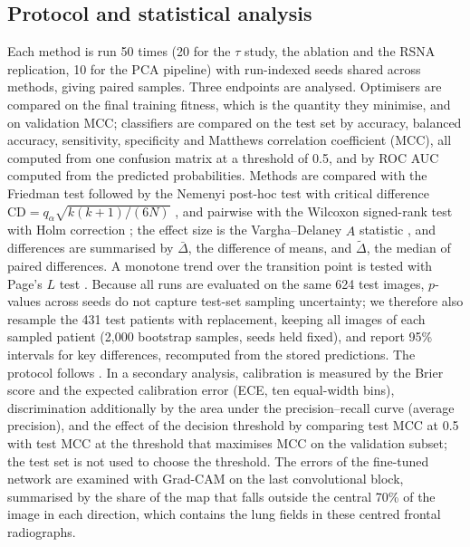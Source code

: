\documentclass[preprint,12pt]{elsarticle}
\begin{document}
\subsection{Protocol and statistical analysis}\label{sec:protocol}
Each method is run 50 times (20 for the $\tau$ study, the ablation and the RSNA replication, 10 for the PCA pipeline) with run-indexed seeds shared across methods, giving paired samples. Three endpoints are analysed. Optimisers are compared on the final training fitness, which is the quantity they minimise, and on validation MCC; classifiers are compared on the test set by accuracy, balanced accuracy, sensitivity, specificity and Matthews correlation coefficient (MCC), all computed from one confusion matrix at a threshold of 0.5, and by ROC AUC computed from the predicted probabilities. Methods are compared with the Friedman test \citep{friedman1937} followed by the Nemenyi post-hoc test with critical difference $\mathrm{CD}=q_{\alpha}\sqrt{k(k+1)/(6N)}$ \citep{demsar2006}, and pairwise with the Wilcoxon signed-rank test \citep{wilcoxon1945} with Holm correction \citep{holm1979}; the effect size is the Vargha--Delaney $\hat A$ statistic \citep{vargha2000}, and differences are summarised by $\bar\Delta$, the difference of means, and $\tilde\Delta$, the median of paired differences. A monotone trend over the transition point is tested with Page's $L$ test \citep{page1963trend}. Because all runs are evaluated on the same 624 test images, $p$-values across seeds do not capture test-set sampling uncertainty; we therefore also resample the 431 test patients with replacement, keeping all images of each sampled patient (2,000 bootstrap samples, seeds held fixed), and report 95\% intervals for key differences, recomputed from the stored predictions. The protocol follows \citet{derrac2011tutorial}. In a secondary analysis, calibration is measured by the Brier score and the expected calibration error (ECE, ten equal-width bins), discrimination additionally by the area under the precision--recall curve (average precision), and the effect of the decision threshold by comparing test MCC at 0.5 with test MCC at the threshold that maximises MCC on the validation subset; the test set is not used to choose the threshold. The errors of the fine-tuned network are examined with Grad-CAM \citep{selvaraju2017gradcam} on the last convolutional block, summarised by the share of the map that falls outside the central 70\% of the image in each direction, which contains the lung fields in these centred frontal radiographs.
\end{document}
